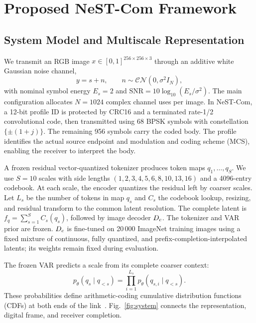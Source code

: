 \section{Proposed NeST-Com Framework}
\subsection{System Model and Multiscale Representation}
We transmit an RGB image $x\in[0,1]^{256\times256\times3}$ through an additive white Gaussian noise channel,
\begin{equation}
 y=s+n,\qquad n\sim\mathcal{CN}(0,\sigma^2 I_N),
 \label{eq:channel}
\end{equation}
with nominal symbol energy $E_s=2$ and $\mathrm{SNR}=10\log_{10}(E_s/\sigma^2)$. The main configuration allocates $N=1024$ complex channel uses per image. In NeST-Com, a 12-bit profile ID is protected by CRC16 and a terminated rate-1/2 convolutional code, then transmitted using 68 BPSK symbols with constellation $\{\pm(1+j)\}$. The remaining 956 symbols carry the coded body. The profile identifies the actual source endpoint and modulation and coding scheme (MCS), enabling the receiver to interpret the body.

A frozen residual vector-quantized tokenizer produces token maps $q_1,\ldots,q_S$. We use $S=10$ scales with side lengths $(1,2,3,4,5,6,8,10,13,16)$ and a 4096-entry codebook. At each scale, the encoder quantizes the residual left by coarser scales. Let $L_s$ be the number of tokens in map $q_s$ and $C_s$ the codebook lookup, resizing, and residual transform to the common latent resolution. The complete latent is $f_q=\sum_{s=1}^S C_s(q_s)$, followed by image decoder $D_c$. The tokenizer and VAR prior are frozen. $D_c$ is fine-tuned on 20\,000 ImageNet training images using a fixed mixture of continuous, fully quantized, and prefix-completion-interpolated latents; its weights remain fixed during evaluation.

The frozen VAR predicts a scale from its complete coarser context:
\begin{equation}
 p_\theta(q_s\mid q_{<s})=\prod_{i=1}^{L_s}p_\theta(q_{s,i}\mid q_{<s}).
 \label{eq:prior}
\end{equation}
These probabilities define arithmetic-coding cumulative distribution functions (CDFs) at both ends of the link~\cite{arithmetic}. Fig.~\ref{fig:system} connects the representation, digital frame, and receiver completion.

